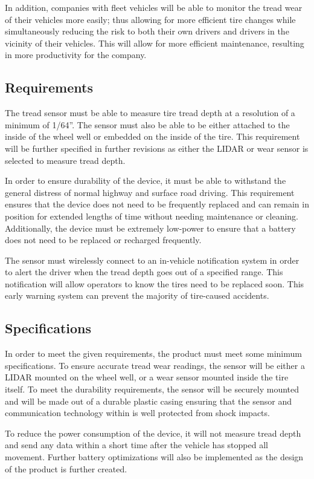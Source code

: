 \documentclass[11pt]{IEEEtran}
\begin{document}
			In addition, companies with fleet vehicles will be able to monitor the tread wear of their vehicles more easily; thus allowing for more efficient tire changes while simultaneously reducing the risk to both their own drivers and drivers in the vicinity of their vehicles. This will allow for more efficient maintenance, resulting in more productivity for the company. 

		\subsection{Requirements}
			The tread sensor must be able to measure tire tread depth at a resolution of a minimum of 1/64''. The sensor must also be able to be either attached to the inside of the wheel well or embedded on the inside of the tire. This requirement will be further specified in further revisions as either the LIDAR or wear sensor is selected to measure tread depth.

			In order to ensure durability of the device, it must be able to withstand the general distress of normal highway and surface road driving. This requirement ensures that the device does not need to be frequently replaced and can remain in position for extended lengths of time without needing maintenance or cleaning. Additionally, the device must be extremely low-power to ensure that a battery does not need to be replaced or recharged frequently.

			The sensor must wirelessly connect to an in-vehicle notification system in order to alert the driver when the tread depth goes out of a specified range. This notification will allow operators to know the tires need to be replaced soon. This early warning system can prevent the majority of tire-caused accidents.
 
		\subsection{Specifications}
			In order to meet the given requirements, the product must meet some minimum specifications. To ensure accurate tread wear readings, the sensor will be either a LIDAR mounted on the wheel well, or a wear sensor mounted inside the tire itself. To meet the durability requirements, the sensor will be securely mounted and will be made out of a durable plastic casing ensuring that the sensor and communication technology within is well protected from shock impacts.

			To reduce the power consumption of the device, it will not measure tread depth and send any data within a short time after the vehicle has stopped all movement. Further battery optimizations will also be implemented as the design of the product is further created. 
\end{document}
